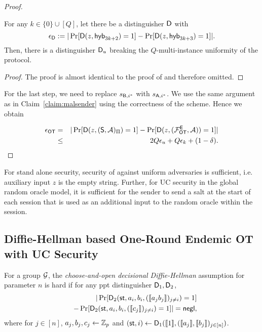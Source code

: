 \begin{proof}
\begin{claim}\label{claim:first}
For any $k\in\{0\}\cup[Q]$, let there be a distinguisher $\mathsf D$ with
$$
\epsilon_{\mathsf D}:=|\Pr[\mathsf D(z,\mathsf{hyb}_{3k+2})=1] -\Pr[\mathsf D(z,\mathsf{hyb}_{3k+3})=1]|.
$$
Then, there is a distinguisher $\mathsf D_u$ breaking the $Q$-multi-instance uniformity of the \UKA protocol.
\end{claim}

\begin{proof}
The proof is almost identical to the proof of  and therefore omitted.
\pe
\end{proof}

For the last step, we need to replace $s_{\mathsf{B},i^*}$ with $s_{\mathsf{A},i^*}$. We use the same argument as in Claim~\ref{claim:malsender} using the correctness of the scheme. Hence we obtain

\begin{eqnarray*}
\epsilon_{\mathsf{OT}} &=&|\Pr[\mathsf D(z,(\mathsf{S}, \mathcal{A})_{\Pi})=1] -\Pr[\mathsf D(z,(\mathcal{F}_{\mathsf{OT}}^\mathsf{E},\mathcal{A}))=1]|\\
&\leq &2Q\epsilon_{u}+Q\epsilon_{k}+(1-\delta).
\end{eqnarray*}
\pe
\end{proof}


\begin{remark}
For stand alone security, security of \UKA against uniform adversaries is sufficient, i.e. auxiliary input $z$ is the empty string. Further, for UC security in the global random oracle model, it is sufficient for the sender to send a salt at the start of each session that is used as an additional input to the random oracle within the session. 
\end{remark}







\subsection{Diffie-Hellman based One-Round Endemic OT with UC Security }\label{sec:ddhProof}



\begin{definition}\label{def:CODDH}
	For a group $\mathcal{G}$, the \emph{choose-and-open decisional Diffie-Hellman} assumption for parameter $n$ is hard if for any ppt distinguisher $\mathsf D_1,\mathsf D_2$,
	\begin{eqnarray*}
		&&|\Pr[ \mathsf D_2(\mathsf{st},a_i,b_i,(\llbracket a_{j}b_{j}\rrbracket)_{j\neq i})=1]\\
		&&-\Pr[ \mathsf D_2(\mathsf{st},a_i,b_i,(\llbracket c_{j}\rrbracket)_{j\neq i})=1]|=\mathsf{negl},
	\end{eqnarray*}
	where for $j\in[n]$, $a_j,b_j,c_j\leftarrow\mathbb Z_p$ and $(\mathsf{st}, i)\leftarrow\mathsf D_1(\llbracket 1\rrbracket, (\llbracket a_j\rrbracket,\llbracket b_j\rrbracket)_{j\in [n]})$.
\end{definition}

